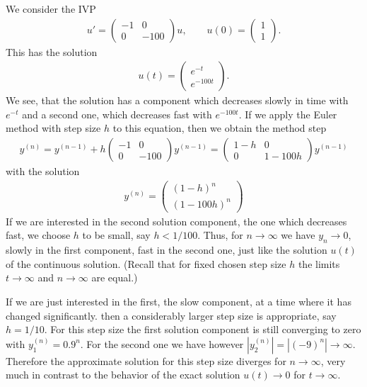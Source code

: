 \begin{example}
  \label{ex:impl:2}
  We consider the IVP
  \begin{gather}
    \label{eq:implicit:5}
    u' =
    \begin{pmatrix}
      -1 & 0 \\ 0 & -100
    \end{pmatrix}u,
    \qquad u(0) =
    \begin{pmatrix}
      1 \\ 1
    \end{pmatrix}.
  \end{gather}
  This has the solution
  \begin{gather*}
    u(t) =
    \begin{pmatrix}
      e^{-t} \\ e^{-100t}
    \end{pmatrix}.
  \end{gather*}
  We see, that the solution has a component which decreases slowly in
  time with $e^{-t}$ and a second one, which decreases fast with
  $e^{-100t}$. If we apply the Euler method with step size $h$ to this
  equation, then we obtain the method step
  \begin{gather*}
    y^{(n)} = y^{(n-1)} + h
    \begin{pmatrix}
      -1 & 0 \\ 0 & -100
    \end{pmatrix} y^{(n-1)}
    = \begin{pmatrix}
      1-h & 0 \\ 0 & 1-100h
    \end{pmatrix}y^{(n-1)}
  \end{gather*}
  with the solution
  \begin{gather*}
    y^{(n)} =
    \begin{pmatrix}
      (1-h)^n \\ (1-100h)^n
    \end{pmatrix}
  \end{gather*}
  If we are interested in the second solution component, the one which
  decreases fast, we choose $h$ to be small, say $h<1/100$. Thus, for
  $n\to\infty$ we have $y_n\to 0$, slowly in the first component, fast
  in the second one, just like the solution $u(t)$ of the continuous
  solution.  (Recall that for fixed chosen step size $h$ the limits
  $t\to\infty$ and $n\to\infty$ are equal.)
  
  If we are just interested in the first, the slow component, at a
  time where it has changed significantly.  then a considerably larger
  step size is appropriate, say $h=1/10$. For this step size the
  first solution component is still converging to zero with $y^{(n)}_1
  = 0.9^n$.  For the second one we have however $|y^{(n)}_2| =
  |(-9)^n| \to \infty$. Therefore the approximate solution for this
  step size diverges for $n\to\infty$, very much in contrast to the
  behavior of the exact solution $u(t)\to 0$ for $t\to\infty$.
\end{example}

